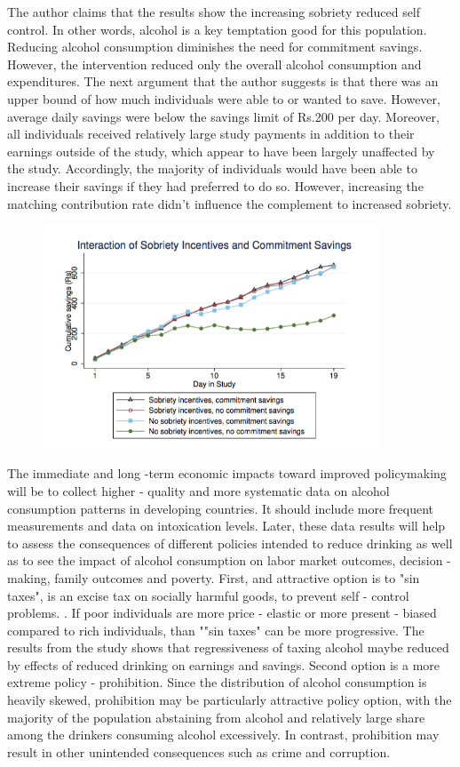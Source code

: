 \documentclass[a4paper,12pt]{article}
\begin{document}
The author claims that the results show the increasing sobriety reduced self control. In other words, alcohol is a key temptation good for this population.  Reducing alcohol consumption diminishes the need for commitment savings. However, the intervention reduced only the overall alcohol consumption and expenditures. The next argument that the author suggests is that there was an upper bound of how much individuals were able to or wanted to save. However, average daily savings were below the savings limit of Rs.200 per day. Moreover, all individuals received relatively large study payments in addition to their earnings outside of the study, which appear to have been largely unaffected by the study. Accordingly, the majority of individuals would have been able to increase their savings if they had preferred to do so. However, increasing the matching contribution rate didn't influence the complement to increased sobriety. 

\begin{figure}[h]
\centering
\includegraphics[width=0.9\textwidth]{Figure6.png}
\caption{\label{fig:Figure6}}
\end{figure}


The immediate and long -term economic impacts toward improved policymaking will be to collect higher - quality and more systematic data on alcohol consumption patterns in developing countries. It should include more frequent measurements and data on intoxication levels. Later, these data results will help to assess the consequences of different policies intended to reduce drinking as well as to see the impact of alcohol consumption on labor market outcomes, decision - making, family outcomes and poverty. First, and attractive option is to "sin taxes", is an excise tax on socially harmful goods, to prevent self - control problems. \cite{Gruber01}. If poor individuals are more price - elastic or more present - biased compared to rich individuals, than ""sin taxes" can be more progressive. The results from the study shows that regressiveness of taxing alcohol maybe reduced by effects of reduced drinking on earnings and savings.  
Second option is a more extreme policy - prohibition. Since the distribution of alcohol consumption is heavily skewed, prohibition may be particularly attractive policy option, with the majority of the population abstaining from alcohol and relatively large share among the drinkers consuming alcohol excessively. In contrast, prohibition may result in other unintended consequences such as crime and corruption\cite{Thornton91}.
\end{document}
